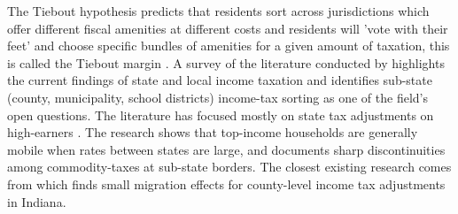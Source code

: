 \documentclass[12pt]{article}
\begin{document}
The Tiebout hypothesis predicts that residents sort across
jurisdictions which offer different fiscal amenities at different costs and residents will 'vote with their feet' and choose specific bundles of amenities for a given amount of taxation, this is called the Tiebout margin \citep{tiebout1956}. A survey of the literature conducted by \citet{agrawalLessonsStateLocal} highlights the current findings of state and local income taxation and identifies sub-state (county, municipality, school districts) income-tax sorting as one of the field's open questions.
The literature has focused mostly on state tax adjustments on high-earners
\citep{young2016, agrawalRelocationRichMigration2019}. The research shows that
top-income households are generally mobile when rates between states are large, and \citet{agrawal2015gradient} documents sharp discontinuities among commodity-taxes at sub-state borders. The closest existing research comes from
\citet{yangRESPONSIVENESSINCOMELOCAL2017} which  finds small migration effects for county-level income tax adjustments in Indiana.
\end{document}
